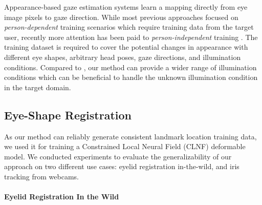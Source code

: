 Appearance-based gaze estimation systems learn a mapping directly from eye image pixels to gaze direction.
While most previous approaches focused on {\em person-dependent} training scenarios which require training data from the target user, recently more attention has been paid to {\em person-independent} training \cite{zhang15_cvpr,sugano2014learning,funes2013person,schneider2014manifold}. 
The training dataset is required to cover the potential changes in appearance with different eye shapes, arbitrary head poses, gaze directions, and illumination conditions.
%
Compared to \citet{sugano2014learning}, our method can provide a wider range of illumination conditions which can be beneficial to handle the unknown illumination condition in the target domain.


\subsection{Eye-Shape Registration}

As our method can reliably generate consistent landmark location training data, we used it for training a Constrained Local Neural Field (CLNF) \cite{baltrusaitis2013constrained} deformable model. We conducted experiments to evaluate the generalizability of our approach on two different use cases: eyelid registration in-the-wild, and iris tracking from webcams.

\paragraph{Eyelid Registration In the Wild}


